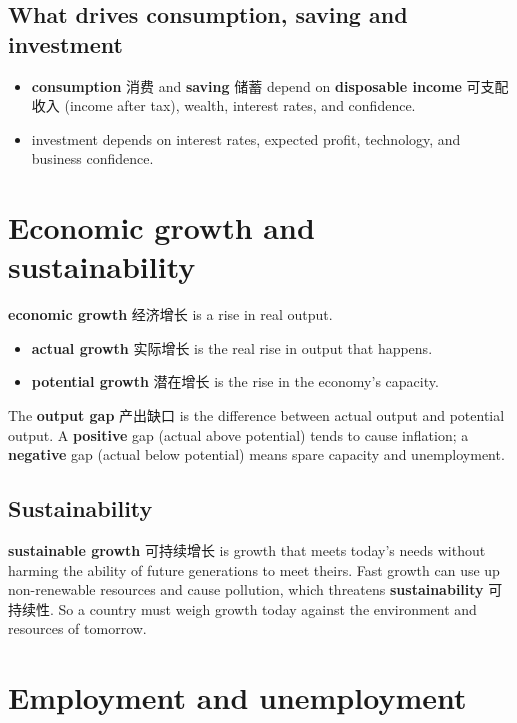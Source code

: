 \documentclass[11pt]{article}
\begin{document}
\subsection*{What drives consumption, saving and investment}

\begin{itemize}
\item \textbf{consumption} 消费 and \textbf{saving} 储蓄 depend on \textbf{disposable income} 可支配收入 (income after tax), wealth, interest rates, and confidence.

\item investment depends on interest rates, expected profit, technology, and business confidence.

\end{itemize}

\section*{Economic growth and sustainability}

\textbf{economic growth} 经济增长 is a rise in real output.

\begin{itemize}
\item \textbf{actual growth} 实际增长 is the real rise in output that happens.

\item \textbf{potential growth} 潜在增长 is the rise in the economy's capacity.

\end{itemize}

The \textbf{output gap} 产出缺口 is the difference between actual output and potential output. A \textbf{positive} gap (actual above potential) tends to cause inflation; a \textbf{negative} gap (actual below potential) means spare capacity and unemployment.

\subsection*{Sustainability}

\textbf{sustainable growth} 可持续增长 is growth that meets today's needs without harming the ability of future generations to meet theirs. Fast growth can use up non-renewable resources and cause pollution, which threatens \textbf{sustainability} 可持续性. So a country must weigh growth today against the environment and resources of tomorrow.

\section*{Employment and unemployment}
\end{document}
